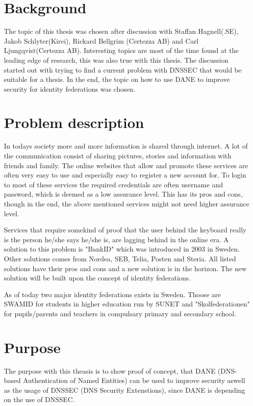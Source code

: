 \section{Background}
The topic of this thesis was chosen after discussion with Staffan Hagnell(.SE), Jakob Schlyter(Kirei), Rickard Bellgrim (Certezza AB) and Carl Ljungqvist(Certezza AB).
Interesting topics are most of the time found at the leading edge of research, this was also true with this thesis.
The discussion started out with trying to find a current problem with DNSSEC that would be suitable for a thesis.
In the end, the topic on how to use DANE to improve security for identity federations was chosen.

\section{Problem description}
In todays society more and more information is shared through internet.
A lot of the communication consist of sharing pictures, stories and information with friends and family.
The online websites that allow and promote these services are often very easy to use and especially easy to register a new account for.
To login to most of these services the required credentials are often username and password, which is deemed as a low assurance level\cite[p.~244]{pdf:SOU}.
This has its pros and cons, though in the end, the above mentioned services might not need higher assurance level.

Services that require somekind of proof that the user behind the keyboard really is the person he/she says he/she is, are lagging behind in the online era.
A solution to this problem is "BankID" which was introduced in 2003\cite{website:bankid-about} in Sweden.
Other solutions comes from Nordea, SEB, Telia, Posten and Steria\cite[p.~256]{pdf:SOU}.
All listed solutions have their pros and cons and a new solution is in the horizon.
The new solution will be built upon the concept of identity federations\cite[p.~23]{pdf:SOU}.

As of today two major identity federations exists in Sweden.
Thoose are SWAMID for students in higher education run by SUNET and "Skolfederationen" for pupils/parents and teachers in compulsary primary and secondary school.

\section{Purpose}
The purpose with this theasis is to show proof of concept, that DANE (DNS-based Authentication of Named Entities) can be used to improve security aswell as the usage of DNSSEC (DNS Security Extenstions), since DANE is depending on the use of DNSSEC.

